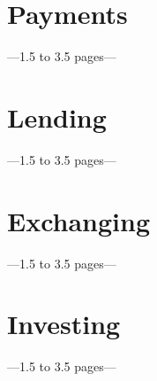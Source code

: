 \section{Payments}
---1.5 to 3.5 pages---

\section{Lending}
---1.5 to 3.5 pages---

\section{Exchanging}
---1.5 to 3.5 pages---

\section{Investing}
---1.5 to 3.5 pages---
